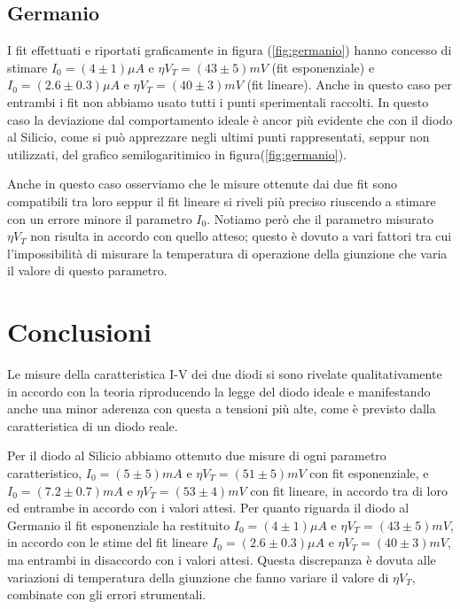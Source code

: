 \documentclass[]{article}
\begin{document}
\subsection{Germanio}
I fit effettuati e riportati graficamente in figura (\ref{fig:germanio}) hanno concesso di stimare $I_0=(4\pm1)\mu A$ e $\eta V_T=(43\pm5)mV$ (fit esponenziale) e $I_0=(2.6\pm0.3)\mu A$ e $\eta V_T=(40\pm3)mV$ (fit lineare). Anche in questo caso per entrambi i fit non abbiamo usato tutti i punti sperimentali raccolti. In questo caso la deviazione dal comportamento ideale è ancor più evidente che con il diodo al Silicio, come si può apprezzare negli ultimi punti rappresentati, seppur non utilizzati, del grafico semilogaritimico in figura(\ref{fig:germanio}).
\begin{comment}
	\begin{figure}[H]
		\centering
		\texttt{[image: ../Germanio/canvas]}
		\caption{Caratteristica I-V del diodo al Germanio: a sinistra sono riportati i punti nel range utilizzato per effettuare il fit esponenziale mentre a destra sono riportati tutti i punti sperimentali in scala semilogaritmica con fit lineare}
		\label{fig:germanio}
	\end{figure}content...
\end{comment}
Anche in questo caso osserviamo che le misure ottenute dai due fit sono compatibili tra loro seppur il fit lineare si riveli più preciso riuscendo a stimare con un errore minore il parametro $I_0$.
Notiamo però che il parametro misurato $\eta V_T$ non risulta in accordo con quello atteso; questo è dovuto a vari fattori tra cui l'impossibilità di misurare la temperatura di operazione della giunzione che varia il valore di questo parametro.
\section*{Conclusioni}
Le misure della caratteristica I-V dei due diodi si sono rivelate qualitativamente in accordo con la teoria riproducendo la legge del diodo ideale e manifestando anche una minor aderenza con questa a tensioni più alte, come è previsto dalla caratteristica di un diodo reale. 

Per il diodo al Silicio abbiamo ottenuto due misure di ogni parametro caratteristico, $I_0=(5\pm5)mA$ e $\eta V_T=(51\pm5)mV$ con fit esponenziale, e $I_0=(7.2\pm0.7)mA$ e $\eta V_T=(53\pm4)mV$ con fit lineare, in accordo tra di loro ed entrambe in accordo con i valori attesi. Per quanto riguarda il diodo al Germanio il fit esponenziale ha restituito $I_0=(4\pm1)\mu A$ e $\eta V_T=(43\pm5)mV$, in accordo con le stime del fit lineare $I_0=(2.6\pm0.3)\mu A$ e $\eta V_T=(40\pm3)mV$, ma entrambi in disaccordo con i valori attesi. Questa discrepanza è dovuta alle variazioni di temperatura della giunzione che fanno variare il valore di $\eta V_T$, combinate con gli errori strumentali.
\end{document}
